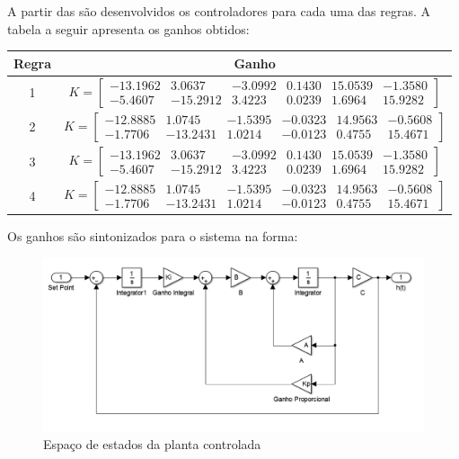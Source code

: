 A partir das  são desenvolvidos os controladores para cada uma das regras. A tabela a seguir apresenta os ganhos obtidos:
\begin{center}
	\begin{tabular}{|c|c|}
		\hline
		Regra & Ganho \\ \hline
		 1 & $ K = 
			\begin{bmatrix}
				-13.1962 & 3.0637 & -3.0992 & 0.1430 & 15.0539 & -1.3580\\
				-5.4607 & -15.2912 & 3.4223 & 0.0239 & 1.6964 & 15.9282
			\end{bmatrix}$ \\[20pt] \hline
		2 & $ K = 
			\begin{bmatrix}
				-12.8885 & 1.0745 & -1.5395 & -0.0323 & 14.9563 & -0.5608\\
				-1.7706 & -13.2431 & 1.0214 & -0.0123 & 0.4755 & 15.4671
			\end{bmatrix}$ \\[20pt] \hline
		3 & $ K = 
			\begin{bmatrix}
				-13.1962 & 3.0637 & -3.0992 & 0.1430 & 15.0539 & -1.3580\\
				-5.4607 & -15.2912 & 3.4223 & 0.0239 & 1.6964 & 15.9282
			\end{bmatrix}$ \\[20pt] \hline
		4 & $ K = 
			\begin{bmatrix}
				-12.8885 & 1.0745 & -1.5395 & -0.0323 & 14.9563 & -0.5608\\
				-1.7706 & -13.2431 & 1.0214 & -0.0123 & 0.4755 & 15.4671
			\end{bmatrix}$ \\[20pt] \hline
	\end{tabular}
\end{center}

Os ganhos são sintonizados para o sistema na forma:
\begin{figure}[H]
	\begin{centering}
		\includegraphics[width=\textwidth]{img/modelo_controlado.png}
		\par\end{centering}
	\caption{\label{figPlantCtrl}Espaço de estados da planta controlada}
\end{figure}

